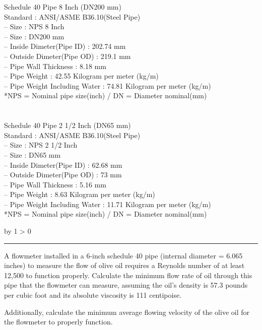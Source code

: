 \documentclass[12pt,a4paper]{article}
\def\oppgave{
            \advance\questnum by 1
            \ifnum \questnum > 0
                 \hrule
                 \vskip 3pt
                 \leftline{Oppgave \the\questnum}
                 \vskip 3pt \fi}
\begin{document}
Schedule 40 Pipe 8 Inch (DN200 mm)\\
Standard : ANSI/ASME B36.10(Steel Pipe)\\
– Size : NPS 8 Inch\\
– Size : DN200 mm\\
– Inside Dimeter(Pipe ID) : 202.74 mm\\
– Outside Dimeter(Pipe OD) : 219.1 mm\\
– Pipe Wall Thickness : 8.18 mm\\
– Pipe Weight : 42.55 Kilogram per meter (kg/m)\\
– Pipe Weight Including Water : 74.81 Kilogram per meter (kg/m)\\
*NPS = Nominal pipe size(inch) / DN = Diameter nominal(mm)\\
\\\\
Schedule 40 Pipe 2 1/2 Inch (DN65 mm)\\
Standard : ANSI/ASME B36.10(Steel Pipe)\\
– Size : NPS 2 1/2 Inch\\
– Size : DN65 mm\\
– Inside Dimeter(Pipe ID) : 62.68 mm\\
– Outside Dimeter(Pipe OD) : 73 mm\\
– Pipe Wall Thickness : 5.16 mm\\
– Pipe Weight : 8.63 Kilogram per meter (kg/m)\\
– Pipe Weight Including Water : 11.71 Kilogram per meter (kg/m)\\
*NPS = Nominal pipe size(inch) / DN = Diameter nominal(mm)\\
\vskip 10pt \filbreak 
\oppgave{} 

A flowmeter installed in a 6-inch schedule 40 pipe (internal diameter = 6.065 inches) to measure the flow of olive oil requires a Reynolds number of at least 12,500 to function properly.  Calculate the minimum flow rate of oil through this pipe that the flowmeter can measure, assuming the oil's density is 57.3 pounds per cubic foot and its absolute viscosity is 111 centipoise.

\vskip 10pt

Additionally, calculate the minimum average flowing velocity of the olive oil for the flowmeter to properly function.
\end{document}
